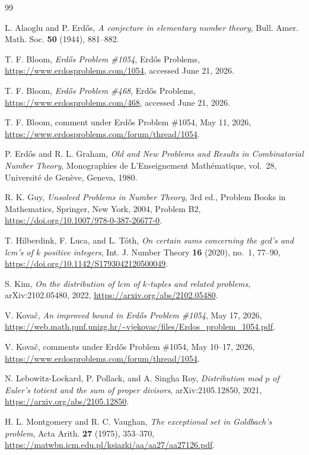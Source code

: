\documentclass[11pt]{article}
\theoremstyle{definition}
\theoremstyle{remark}
\begin{document}
\begin{thebibliography}{99}

L. Alaoglu and P. Erd\H{o}s,
\emph{A conjecture in elementary number theory},
Bull. Amer. Math. Soc. \textbf{50} (1944), 881--882.

T. F. Bloom,
\emph{Erd\H{o}s Problem \#1054},
Erd\H{o}s Problems,
\url{https://www.erdosproblems.com/1054},
accessed June 21, 2026.

T. F. Bloom,
\emph{Erd\H{o}s Problem \#468},
Erd\H{o}s Problems,
\url{https://www.erdosproblems.com/468},
accessed June 21, 2026.

T. F. Bloom,
comment under Erd\H{o}s Problem \#1054,
May 11, 2026,
\url{https://www.erdosproblems.com/forum/thread/1054}.

P. Erd\H{o}s and R. L. Graham,
\emph{Old and New Problems and Results in Combinatorial Number Theory},
Monographies de L'Enseignement Math\'{e}matique, vol.~28,
Universit\'{e} de Gen\`eve, Geneva, 1980.

R. K. Guy,
\emph{Unsolved Problems in Number Theory},
3rd ed., Problem Books in Mathematics,
Springer, New York, 2004,
Problem B2,
\url{https://doi.org/10.1007/978-0-387-26677-0}.

T. Hilberdink, F. Luca, and L. T\'oth,
\emph{On certain sums concerning the gcd's and lcm's of $k$ positive integers},
Int. J. Number Theory \textbf{16} (2020), no.~1, 77--90,
\url{https://doi.org/10.1142/S1793042120500049}.

S. Kim,
\emph{On the distribution of lcm of $k$-tuples and related problems},
arXiv:2102.05480, 2022,
\url{https://arxiv.org/abs/2102.05480}.

V. Kova\v{c},
\emph{An improved bound in Erd\H{o}s Problem \#1054},
May 17, 2026,
\url{https://web.math.pmf.unizg.hr/~vjekovac/files/Erdos_problem_1054.pdf}.

V. Kova\v{c},
comments under Erd\H{o}s Problem \#1054,
May 10--17, 2026,
\url{https://www.erdosproblems.com/forum/thread/1054}.

N. Lebowitz-Lockard, P. Pollack, and A. Singha Roy,
\emph{Distribution mod $p$ of Euler's totient and the sum of proper divisors},
arXiv:2105.12850, 2021,
\url{https://arxiv.org/abs/2105.12850}.

H. L. Montgomery and R. C. Vaughan,
\emph{The exceptional set in Goldbach's problem},
Acta Arith. \textbf{27} (1975), 353--370,
\url{https://matwbn.icm.edu.pl/ksiazki/aa/aa27/aa27126.pdf}.


\end{thebibliography}
\end{document}
